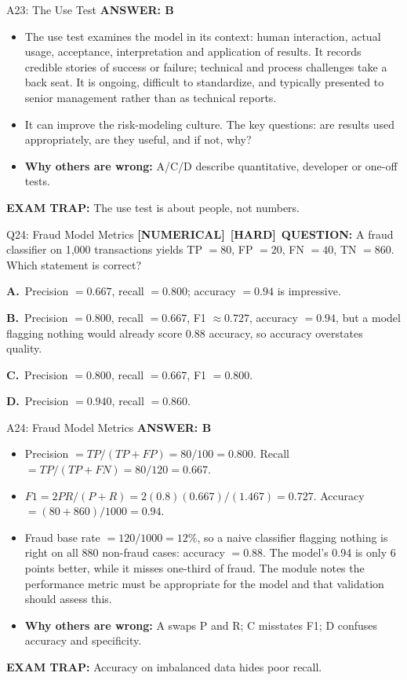 \documentclass[8pt]{beamer}
\newcommand{\fs}{\fontsize{10}{12}\selectfont}
\newcommand{\opts}[4]{\par\vspace{0.12cm}\noindent\textbf{A.}~#1\par\vspace{0.08cm}\noindent\textbf{B.}~#2\par\vspace{0.08cm}\noindent\textbf{C.}~#3\par\vspace{0.08cm}\noindent\textbf{D.}~#4\par}
\newcommand{\ans}[1]{\textcolor{myblue}{\textbf{ANSWER: #1}}}
\newcommand{\trap}[1]{\textcolor{myred}{\textbf{EXAM TRAP:}} #1}
\newcommand{\numtag}{\textcolor{mypurple}{\textbf{[NUMERICAL]}}}
\newcommand{\hard}{\textcolor{myorange}{\textbf{[HARD]}}}
\begin{document}
\begin{frame}[t]{A23: The Use Test}
\fs
\ans{B}
\begin{itemize}
\item The use test examines the model in its context: human interaction, actual usage, acceptance, interpretation and application of results. It records credible stories of success or failure; technical and process challenges take a back seat. It is ongoing, difficult to standardize, and typically presented to senior management rather than as technical reports.
\item It can improve the risk-modeling culture. The key questions: are results used appropriately, are they useful, and if not, why?
\item \textbf{Why others are wrong:} A/C/D describe quantitative, developer or one-off tests.
\end{itemize}
\trap{The use test is about \textcolor{myblue}{people, not numbers}.}
\end{frame}

\begin{frame}[t]{Q24: Fraud Model Metrics}
\fs
\numtag\ \hard\ \textbf{QUESTION:} A fraud classifier on 1,000 transactions yields TP $=80$, FP $=20$, FN $=40$, TN $=860$. Which statement is correct?
\opts{Precision $=0.667$, recall $=0.800$; accuracy $=0.94$ is impressive.}
{Precision $=0.800$, recall $=0.667$, F1 $\approx0.727$, accuracy $=0.94$, but a model flagging nothing would already score 0.88 accuracy, so accuracy overstates quality.}
{Precision $=0.800$, recall $=0.667$, F1 $=0.800$.}
{Precision $=0.940$, recall $=0.860$.}
\end{frame}

\begin{frame}[t]{A24: Fraud Model Metrics}
\fs
\ans{B}
\begin{itemize}
\item Precision $=TP/(TP+FP)=80/100=0.800$. Recall $=TP/(TP+FN)=80/120=0.667$.
\item $F1=2PR/(P+R)=2(0.8)(0.667)/(1.467)=\mathbf{0.727}$. Accuracy $=(80+860)/1000=0.94$.
\item Fraud base rate $=120/1000=12\%$, so a naive classifier flagging nothing is right on all 880 non-fraud cases: accuracy $=0.88$. The model's 0.94 is only 6 points better, while it misses one-third of fraud. The module notes the performance metric must be appropriate for the model and that validation should assess this.
\item \textbf{Why others are wrong:} A swaps P and R; C misstates F1; D confuses accuracy and specificity.
\end{itemize}
\trap{Accuracy on \textcolor{myblue}{imbalanced} data hides poor recall.}
\end{frame}
\end{document}
